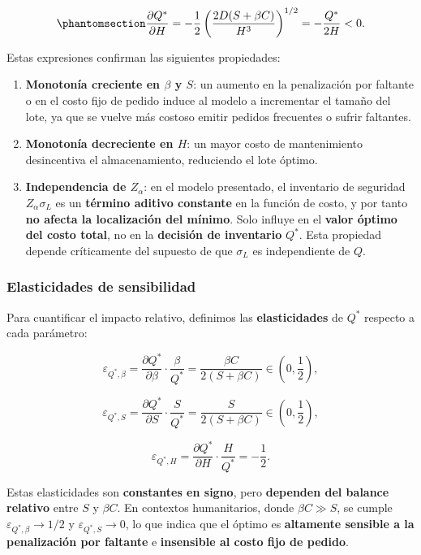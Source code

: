 \documentclass[
  spanish,
  us-letterpaper,
]{scrreprt}
\providecommand{\tightlist}{%
  \setlength{\itemsep}{0pt}\setlength{\parskip}{0pt}}
\numberwithin{equation}{section}
\begin{document}
\begin{equation}\phantomsection\label{eq-dQ_dH}{
\frac{\partial Q^*}{\partial H} = -\frac{1}{2} \left( \frac{2 D (S + \beta C)}{H^3} \right)^{1/2} = -\frac{Q^*}{2 H} < 0.
}\end{equation}

Estas expresiones confirman las siguientes propiedades:

\begin{enumerate}
\def\labelenumi{\arabic{enumi}.}
\tightlist
\item
  \textbf{Monotonía creciente en \(\beta\) y \(S\)}: un aumento en la
  penalización por faltante o en el costo fijo de pedido induce al
  modelo a incrementar el tamaño del lote, ya que se vuelve más costoso
  emitir pedidos frecuentes o sufrir faltantes.
\item
  \textbf{Monotonía decreciente en \(H\)}: un mayor costo de
  mantenimiento desincentiva el almacenamiento, reduciendo el lote
  óptimo.
\item
  \textbf{Independencia de \(Z_\alpha\)}: en el modelo presentado, el
  inventario de seguridad \(Z_\alpha \sigma_L\) es un \textbf{término
  aditivo constante} en la función de costo, y por tanto \textbf{no
  afecta la localización del mínimo}. Solo influye en el \textbf{valor
  óptimo del costo total}, no en la \textbf{decisión de inventario}
  \(Q^*\). Esta propiedad depende críticamente del supuesto de que
  \(\sigma_L\) es independiente de \(Q\).
\end{enumerate}

\subsubsection{Elasticidades de
sensibilidad}\label{elasticidades-de-sensibilidad}

Para cuantificar el impacto relativo, definimos las
\textbf{elasticidades} de \(Q^*\) respecto a cada parámetro:

\[
\varepsilon_{Q^*, \beta} = \frac{\partial Q^*}{\partial \beta} \cdot \frac{\beta}{Q^*} = \frac{\beta C}{2(S + \beta C)} \in \left(0, \frac{1}{2}\right),
\]

\[
\varepsilon_{Q^*, S} = \frac{\partial Q^*}{\partial S} \cdot \frac{S}{Q^*} = \frac{S}{2(S + \beta C)} \in \left(0, \frac{1}{2}\right),
\]

\[
\varepsilon_{Q^*, H} = \frac{\partial Q^*}{\partial H} \cdot \frac{H}{Q^*} = -\frac{1}{2}.
\]

Estas elasticidades son \textbf{constantes en signo}, pero
\textbf{dependen del balance relativo} entre \(S\) y \(\beta C\). En
contextos humanitarios, donde \(\beta C \gg S\), se cumple
\(\varepsilon_{Q^*, \beta} \to 1/2\) y \(\varepsilon_{Q^*, S} \to 0\),
lo que indica que el óptimo es \textbf{altamente sensible a la
penalización por faltante} e \textbf{insensible al costo fijo de
pedido}.
\end{document}
